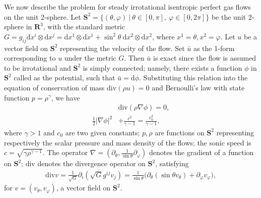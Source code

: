 \documentclass[reqno,12pt]{amsart}
\newcommand{\dd}{\mathrm{d}}
\newcommand{\di}{\mathrm{div}}
\numberwithin{equation}{section}
\begin{document}
We now describe the problem for steady irrotational isentropic perfect gas flows on the unit 2-sphere. Let $\mathbf{S}^2=\{(\theta, \varphi)~|~\theta\in[0,\pi],~\varphi \in [0,2\pi]\}$ be the  unit 2-sphere in $\mathbf{R}^3$, with the standard metric $G=g_{ij}\dd x^i\otimes\dd x^j=\dd x^1\otimes\dd x^1+\sin^2\theta~\dd x^2\otimes\dd x^2$,  where $x^1=\theta, x^2=\varphi$. Let $u$ be a vector field on $\mathbf{S}^2$ representing the velocity of the flow. Set $\bar{u}$ as the 1-form corresponding to $u$ under the metric $G$. Then  $\bar{u}$ is exact since the flow is assumed to be irrotational and $\mathbf{S}^2$ is simply connected; namely, there exists a function $\phi$ in $\mathbf{S}^2$ called as the potential, such that $ \bar{u}= \dd \phi$. Substituting this relation into the equation of conservation of mass $\di(\rho u) = 0$ and Bernoulli's law with state function $p= \rho^{\gamma}$, we have
	\begin{align}
		&\di(\rho \nabla \phi)=0,\label{mass conservation}\\
		\frac{1}{2}|\nabla\phi|^2&+\frac{c^2}{\gamma-1}=\frac{c^2_0}{\gamma-1},\label{potential flow bernoulli}
	\end{align}
where $\gamma> 1$ and $c_0$ are two given constants; $p,\rho$ are functions on $\mathbf{S}^2$ representing respectively the scalar pressure and mass density of the flows; the sonic speed is $c=\sqrt{\gamma \rho^{ \gamma-1}}$. The operator $\nabla=(\partial_\theta,\frac{1}{\sin\theta}\partial_\varphi) $ denotes the gradient of a function on $\mathbf{S}^2$; $\di$ denotes the divergence operator on $\mathbf{S}^2$, satisfying
	\begin{align}\label{di in s2}
		\di v=\frac{1}{\sqrt{G}}\partial_i(\sqrt{G}g^{ij}v_j)=\frac{1}{\sin\theta}\big(\partial_\theta(\sin\theta v_\theta)+\partial_\varphi v_\varphi\big), 
	\end{align}
for $v=(v_\theta, v_\varphi)$, a vector field on $\mathbf{S}^2$.
	 
\end{document}
